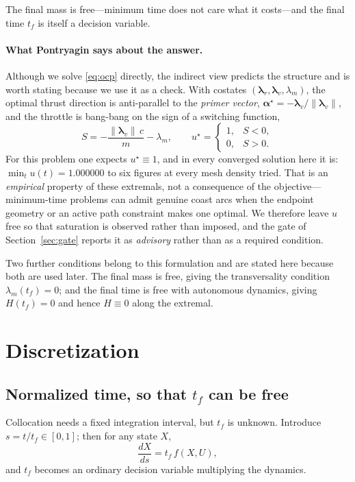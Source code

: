 \documentclass[11pt]{article}
\newcommand{\bal}{\boldsymbol{\alpha}}
\begin{document}
The final mass is free---minimum time does not care what it costs---and the
final time $t_f$ is itself a decision variable.

\label{sec:ocp_pmp}
\paragraph{What Pontryagin says about the answer.} Although we solve
\eqref{eq:ocp} directly, the indirect view predicts the structure and is worth
stating because we use it as a check. With costates
$(\boldsymbol{\lambda}_r, \boldsymbol{\lambda}_v, \lambda_m)$, the optimal
thrust direction is anti-parallel to the \emph{primer vector},
$\bal^\star = -\boldsymbol{\lambda}_v / \lVert \boldsymbol{\lambda}_v \rVert$,
and the throttle is bang-bang on the sign of a switching function,
\[
  S = -\frac{\lVert \boldsymbol{\lambda}_v \rVert\, c}{m} - \lambda_m,
  \qquad u^\star = \begin{cases} 1, & S < 0,\\ 0, & S > 0.\end{cases}
\]
For this problem one expects $u^\star \equiv 1$, and in every converged solution
here it is: $\min_t u(t) = 1.000000$ to six figures at every mesh density tried.
That is an \emph{empirical} property of these extremals, not a consequence of
the objective---minimum-time problems can admit genuine coast arcs when the
endpoint geometry or an active path constraint makes one optimal. We therefore
leave $u$ free so that saturation is observed rather than imposed, and the gate
of Section~\ref{sec:gate} reports it as \emph{advisory} rather than as a
required condition.

Two further conditions belong to this formulation and are stated here because
both are used later. The final mass is free, giving the transversality condition
$\lambda_m(t_f) = 0$; and the final time is free with autonomous dynamics,
giving $H(t_f) = 0$ and hence $H \equiv 0$ along the extremal.

\section{Discretization}
\label{sec:disc}

\subsection{Normalized time, so that \texorpdfstring{$t_f$}{tf} can be free}

Collocation needs a fixed integration interval, but $t_f$ is unknown. Introduce
$s = t/t_f \in [0,1]$; then for any state $X$,
\[
  \frac{dX}{ds} = t_f \, f(X,U),
\]
and $t_f$ becomes an ordinary decision variable multiplying the dynamics.
\end{document}
